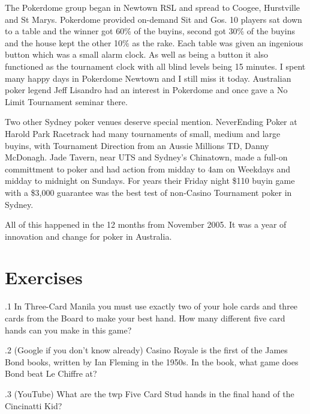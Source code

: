 
The Pokerdome group began in Newtown RSL and spread to Coogee,
Hurstville and St Marys. Pokerdome provided on-demand Sit and Gos.
10 players sat down to a table and the winner got 60\% of the buyins,
second got 30\% of the buyins and the house kept the other 10\% as the
rake. Each table was given an ingenious button which was a small
alarm clock. As well as being a button it also functioned
as the tournament clock with all blind levels being 15 minutes.
I spent many happy days in Pokerdome Newtown and I still miss it
today. Australian poker legend Jeff Lisandro had an interest in
Pokerdome and once gave a No Limit Tournament seminar there.

Two other Sydney poker venues deserve special mention. NeverEnding
Poker at Harold Park Racetrack had many tournaments of small, medium
and large buyins, with Tournament Direction from an Aussie Millions
TD, Danny McDonagh. Jade Tavern, near UTS and Sydney's Chinatown, made
a full-on committment to poker and had action from midday to 4am on
Weekdays and midday to midnight on Sundays. For years their Friday
night \$110 buyin game with a \$3,000 guarantee was the best test of
non-Casino Tournament poker in Sydney.

All of this happened in the 12 months from November 2005. It was a
year of innovation and change for poker in Australia.


\section{Exercises}

.1 In Three-Card Manila you must use exactly two of
your hole cards and three cards from the Board to make your best
hand. How many different five card hands can you make in this game?

.2 (Google if you don't know already) Casino Royale
is the first of the James Bond books, written by Ian Fleming in the
1950s. In the book, what game does Bond beat Le Chiffre at?

.3 (YouTube) What are the twp Five Card Stud hands in
the final hand of the Cincinatti Kid?
